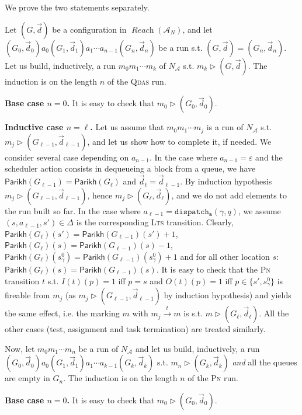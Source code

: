 \documentclass[runningheads,oribibl,]{article}
\newcommand{\Aa}{\ensuremath{\mathcal{A}}\xspace}
\newcommand{\cfont}[1]{\ensuremath{\mathtt{#1}}\xspace}
\newcommand{\lts}{\textsc{Lts}\xspace}
\newcommand{\pn}{\textsc{Pn}\xspace}
\newcommand{\qdas}{\textsc{Qdas}\xspace}
\DeclareMathOperator{\Reach}{\textit{Reach}}
\newcommand{\Data}{\ensuremath{\vec{d}}}
\newcommand{\dispa}{\ensuremath{\cfont{dispatch_a}}}
\newcommand{\Parikh}{\ensuremath{\mathsf{Parikh}}}
\newenvironment{proof}{\noindent{\it Proof.\hspace*{.5cm}}}{}
\begin{document}
\begin{proof}
  We prove the two statements separately.

  Let $(G,\Data)$ be a configuration in $\Reach(\Aa_N)$, and let
  $(G_0,\Data_0)a_0(G_1,\Data_1)a_1\cdots a_{n-1}(G_n,\Data_n)$ be a
  run s.t. $(G,\Data)=(G_n,\Data_n)$. Let us build, inductively, a run
  $m_0m_1\cdots m_k$ of $N_\Aa$ s.t. $m_k\rhd (G,\Data)$. The
  induction is on the length $n$ of the \qdas run.

  \textbf{Base case $n=0$.} It is easy to check that $m_0\rhd
  (G_0,\Data_0)$.

  \textbf{Inductive case $n=\ell$.} Let us assume that $m_0m_1\cdots
  m_j$ is a run of $N_\Aa$ s.t. $m_j\rhd (G_{\ell-1},\Data_{\ell-1})$,
  and let us show how to complete it, if needed. We consider several
  case depending on $a_{n-1}$. In the case where $a_{n-1}=\varepsilon$
  and the scheduler action consists in dequeueing a block from a queue,
  we have $\Parikh(G_{\ell-1})=\Parikh(G_\ell)$ and
  $\Data_\ell=\Data_{\ell-1}$. By induction hypothesis $m_j\rhd
  (G_{\ell-1},\Data_{\ell-1})$, hence $m_j\rhd (G_\ell, \Data_\ell)$,
  and we do not add elements to the run built so far. In the case
  where $a_{\ell-1}=\dispa(\gamma,q)$, we assume
  $(s,a_{\ell-1},s')\in\Delta$ is the corresponding \lts
  transition. Clearly,
  $\Parikh(G_\ell)(s')=\Parikh(G_{\ell-1})(s')+1$,
  $\Parikh(G_\ell)(s)=\Parikh(G_{\ell-1})(s)-1$,
  $\Parikh(G_\ell)(s^0_\gamma)=\Parikh(G_{\ell-1})(s^0_\gamma)+1$ and
  for all other location $s$:
  $\Parikh(G_\ell)(s)=\Parikh(G_{\ell-1})(s)$. It is easy to check
  that the \pn transition $t$ s.t. $I(t)(p)=1$ iff $p=s$ and
  $O(t)(p)=1$ iff $p\in\{s',s^0_\gamma\}$ is fireable from $m_j$ (as
  $m_j\rhd (G_{\ell-1},\Data_{\ell-1})$ by induction hypothesis) and
  yields the same effect, i.e. the marking $m$ with
  $m_j\xrightarrow{t}m$ is s.t. $m\rhd (G_\ell,\Data_\ell)$. All the
  other cases (test, assignment and task termination) are treated
  similarly.  \medskip

  Now, let $m_0m_1\cdots m_n$ be a run of $N_\Aa$ and let us build,
  inductively, a run $(G_0,\Data_0)a_0(G_1,\Data_1)a_1\cdots
  a_{k-1}(G_k,\Data_k)$ s.t. $m_n\rhd (G_k,\Data_k)$ \emph{and} all
  the queues are empty in $G_n$. The induction is on the length $n$ of
  the \pn run.

  \textbf{Base case $n=0$.} It is easy to check that $m_0\rhd
  (G_0,\Data_0)$.


\end{proof}
\end{document}
